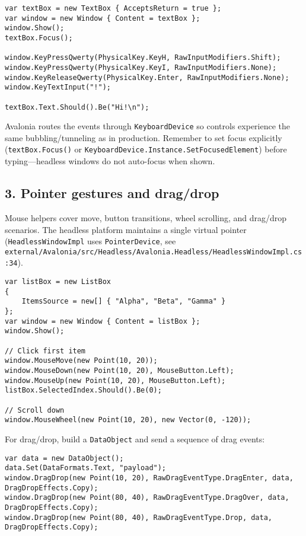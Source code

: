 \begin{lstlisting}
var textBox = new TextBox { AcceptsReturn = true };
var window = new Window { Content = textBox };
window.Show();
textBox.Focus();

window.KeyPressQwerty(PhysicalKey.KeyH, RawInputModifiers.Shift);
window.KeyPressQwerty(PhysicalKey.KeyI, RawInputModifiers.None);
window.KeyReleaseQwerty(PhysicalKey.Enter, RawInputModifiers.None);
window.KeyTextInput("!");

textBox.Text.Should().Be("Hi!\n");
\end{lstlisting}

Avalonia routes the events through
\passthrough{\lstinline!KeyboardDevice!} so controls experience the same
bubbling/tunneling as in production. Remember to set focus explicitly
(\passthrough{\lstinline!textBox.Focus()!} or
\passthrough{\lstinline!KeyboardDevice.Instance.SetFocusedElement!})
before typing---headless windows do not auto-focus when shown.

\subsection{3. Pointer gestures and
drag/drop}\label{pointer-gestures-and-dragdrop}

Mouse helpers cover move, button transitions, wheel scrolling, and
drag/drop scenarios. The headless platform maintains a single virtual
pointer (\passthrough{\lstinline!HeadlessWindowImpl!} uses
\passthrough{\lstinline!PointerDevice!}, see
\passthrough{\lstinline!external/Avalonia/src/Headless/Avalonia.Headless/HeadlessWindowImpl.cs:34!}).

\begin{lstlisting}
var listBox = new ListBox
{
    ItemsSource = new[] { "Alpha", "Beta", "Gamma" }
};
var window = new Window { Content = listBox };
window.Show();

// Click first item
window.MouseMove(new Point(10, 20));
window.MouseDown(new Point(10, 20), MouseButton.Left);
window.MouseUp(new Point(10, 20), MouseButton.Left);
listBox.SelectedIndex.Should().Be(0);

// Scroll down
window.MouseWheel(new Point(10, 20), new Vector(0, -120));
\end{lstlisting}

For drag/drop, build a \passthrough{\lstinline!DataObject!} and send a
sequence of drag events:

\begin{lstlisting}
var data = new DataObject();
data.Set(DataFormats.Text, "payload");
window.DragDrop(new Point(10, 20), RawDragEventType.DragEnter, data, DragDropEffects.Copy);
window.DragDrop(new Point(80, 40), RawDragEventType.DragOver, data, DragDropEffects.Copy);
window.DragDrop(new Point(80, 40), RawDragEventType.Drop, data, DragDropEffects.Copy);
\end{lstlisting}

